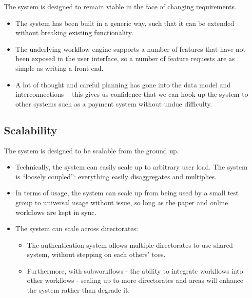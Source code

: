 \documentclass[12pt,a4paper,twosided]{article}
\begin{document}
The system is designed to remain viable in the face of changing
requirements.

\begin{itemize}

\item
  The system has been built in a generic way, such that it can be
  extended without breaking existing functionality.
\item
  The underlying workflow engine supports a number of features that have
  not been exposed in the user interface, so a number of feature
  requests are as simple as writing a front end.
\item
  A lot of thought and careful planning has gone into the data model and
  interconnections -- this gives us confidence that we can hook up the
  system to other systems such as a payment system without undue
  difficulty.
\end{itemize}

\subsection{Scalability}

The system is designed to be scalable from the ground up.

\begin{itemize}

\item
  Technically, the system can easily scale up to arbitrary user load.
  The system is ``loosely coupled'': everything easily disaggregates and
  multiplies.
\item
  In terms of usage, the system can scale up from being used by a small
  test group to universal usage without issue, so long as the paper and
  online workflows are kept in sync.
\item
  The system can scale across directorates:

  \begin{itemize}
  
  \item
    The authentication system allows multiple directorates to use shared
    system, without stepping on each others' toes.
  \item
    Furthermore, with subworkflows - the ability to integrate workflows
    into other workflows - scaling up to more directorates and areas
    will enhance the system rather than degrade it.
  \end{itemize}
\end{itemize}
\end{document}
